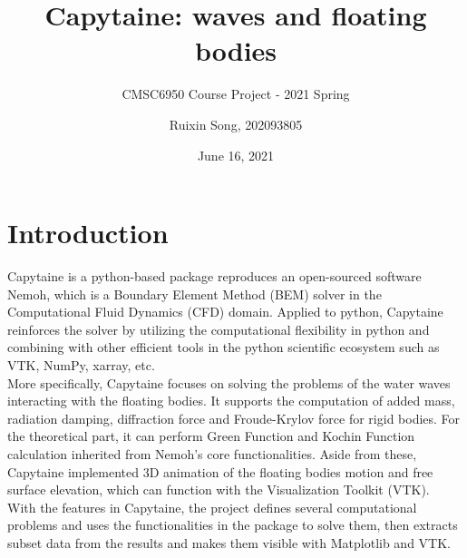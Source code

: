 \documentclass{article}
\title{Capytaine: waves and floating bodies}
\subtitle{CMSC6950 Course Project - 2021 Spring}
\author{Ruixin Song, 202093805}
\date{June 16, 2021}
\begin{document}
\maketitle

\section{Introduction}
Capytaine\cite{Ancellin2019} is a python-based package reproduces an open-sourced software Nemoh, which is a Boundary Element Method (BEM) solver in the Computational Fluid Dynamics (CFD) domain. Applied to python, Capytaine reinforces the solver by utilizing the computational flexibility in python and combining with other efficient tools in the python scientific ecosystem such as VTK, NumPy, xarray, etc. \\

More specifically, Capytaine focuses on solving the problems of the water waves interacting with the floating bodies. It supports the computation of added mass, radiation damping, diffraction force and Froude-Krylov force for rigid bodies. For the theoretical part, it can perform Green Function and Kochin Function calculation inherited from Nemoh's core functionalities. Aside from these, Capytaine implemented 3D animation of the floating bodies motion and free surface elevation, which can function with the Visualization Toolkit (VTK).\\

With the features in Capytaine, the project defines several computational problems and uses the functionalities in the package to solve them, then extracts subset data from the results and makes them visible with Matplotlib and VTK.
\end{document}
